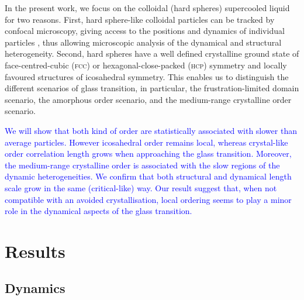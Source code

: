 In the present work, we focus on the colloidal (hard spheres) supercooled liquid \cite{pusey1987ogt} for two reasons. First, hard sphere-like colloidal particles can be tracked by confocal microscopy, giving access to the positions and dynamics of individual particles \cite{kegel2000swe, weeks2000}, thus allowing microscopic analysis of the dynamical and structural heterogeneity. Second, hard spheres have a well defined crystalline ground state of face-centred-cubic (\textsc{fcc}) or hexagonal-close-packed (\textsc{hcp}) symmetry and locally favoured structures of icosahedral symmetry. This enables us to distinguish the different scenarios of glass transition, in particular, the frustration-limited domain scenario, the amorphous order scenario, and the medium-range crystalline order scenario.

\textcolor{blue}{We will show that both kind of order are statistically associated with slower than average particles. However icosahedral order remains local, whereas crystal-like order correlation length grows when approaching the glass transition. Moreover, the medium-range crystalline order is associated with the slow regions of the dynamic heterogeneities. We confirm that both structural and dynamical length scale grow in the same (critical-like) way. Our result suggest that, when not compatible with an avoided crystallisation, local ordering seems to play a minor role in the dynamical aspects of the glass transition.}


\section*{Results}

\subsection*{Dynamics}

